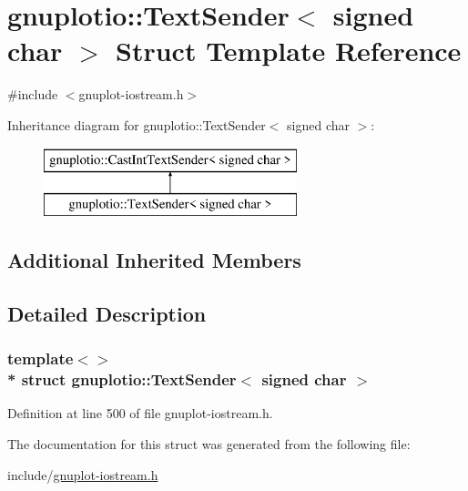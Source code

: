 \hypertarget{structgnuplotio_1_1_text_sender_3_01signed_01char_01_4}{}\section{gnuplotio\+:\+:Text\+Sender$<$ signed char $>$ Struct Template Reference}
\label{structgnuplotio_1_1_text_sender_3_01signed_01char_01_4}


{\ttfamily \#include $<$gnuplot-\/iostream.\+h$>$}

Inheritance diagram for gnuplotio\+:\+:Text\+Sender$<$ signed char $>$\+:\begin{figure}[H]
\begin{center}
\leavevmode
\includegraphics[height=2.000000cm]{structgnuplotio_1_1_text_sender_3_01signed_01char_01_4}
\end{center}
\end{figure}
\subsection*{Additional Inherited Members}


\subsection{Detailed Description}
\subsubsection*{template$<$$>$\\*
struct gnuplotio\+::\+Text\+Sender$<$ signed char $>$}



Definition at line 500 of file gnuplot-\/iostream.\+h.



The documentation for this struct was generated from the following file\+:\begin{DoxyCompactItemize}
\item 
include/\hyperlink{gnuplot-iostream_8h}{gnuplot-\/iostream.\+h}\end{DoxyCompactItemize}
